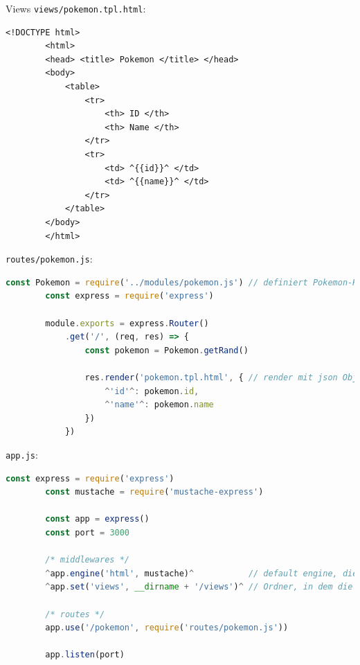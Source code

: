 \begin{example}{Views}
    \texttt{views/pokemon.tpl.html}:
    \begin{lstlisting}[language=HTML5]
        <!DOCTYPE html>
        <html>
        <head> <title> Pokemon </title> </head>
        <body>
            <table>
                <tr> 
                    <th> ID </th> 
                    <th> Name </th> 
                </tr>
                <tr> 
                    <td> ^{{id}}^ </td> 
                    <td> ^{{name}}^ </td> 
                </tr>
            </table>
        </body>
        </html>
    \end{lstlisting}

    \texttt{routes/pokemon.js}:
    \begin{lstlisting}[language=JavaScript]
        const Pokemon = require('../modules/pokemon.js') // definiert Pokemon-Klasse
        const express = require('express')
        
        module.exports = express.Router()
            .get('/', (req, res) => {
                const pokemon = Pokemon.getRand()

                res.render('pokemon.tpl.html', { // render mit json Objekt, key -> Platzhalter
                    ^'id'^: pokemon.id,
                    ^'name'^: pokemon.name 
                })
            })
    \end{lstlisting}

    \texttt{app.js}:
    \begin{lstlisting}[language=JavaScript]
        const express = require('express')
        const mustache = require('mustache-express')

        const app = express()
        const port = 3000

        /* middlewares */
        ^app.engine('html', mustache)^           // default engine, die von res.render() genutzt wird
        ^app.set('views', __dirname + '/views')^ // Ordner, in dem die engine nach html Dateien sucht

        /* routes */
        app.use('/pokemon', require('routes/pokemon.js'))
        
        app.listen(port)
    \end{lstlisting}
\end{example}
